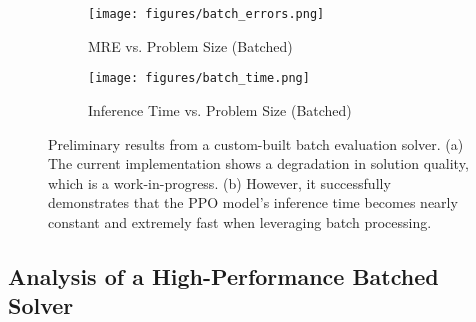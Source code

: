 
\begin{figure}[H]
    \centering
    \begin{subfigure}[b]{0.7\textwidth}
        \centering
        \texttt{[image: figures/batch\_errors.png]}
        \caption{MRE vs. Problem Size (Batched)}
        \label{fig:batch_mre}
    \end{subfigure}
    
    \vspace{1em} 
    
    \begin{subfigure}[b]{0.7\textwidth}
        \centering
        \texttt{[image: figures/batch\_time.png]}
        \caption{Inference Time vs. Problem Size (Batched)}
        \label{fig:batch_time}
    \end{subfigure}
    
    \caption{Preliminary results from a custom-built batch evaluation solver. (a) The current implementation shows a degradation in solution quality, which is a work-in-progress. (b) However, it successfully demonstrates that the PPO model's inference time becomes nearly constant and extremely fast when leveraging batch processing.}
    \label{fig:batch_solver_results}
\end{figure}

\subsection{Analysis of a High-Performance Batched Solver}
\label{sec:analysis_batch_solver}

